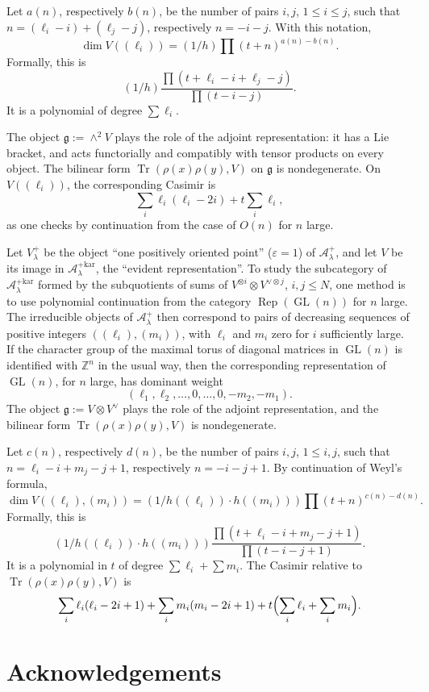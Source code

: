 \documentclass[11pt,a4paper]{article}
\DeclareMathOperator{\Tr}{Tr}
\DeclareMathOperator{\Rep}{Rep}
\DeclareMathOperator{\GL}{GL}
\newcommand{\frg}{\mathfrak{g}}
\newcommand{\Z}{\mathbb{Z}}
\begin{document}
Let $a(n)$, respectively $b(n)$, be the number of pairs $i,j$, $1\leq i\leq j$, such that $n=(\ell_i-i)+(\ell_j-j)$, respectively $n=-i-j$. With this notation,
\[
\dim V((\ell_i))=(1/h)\prod(t+n)^{a(n)-b(n)}.
\]
Formally, this is
\[
(1/h)\frac{\prod(t+\ell_i-i+\ell_j-j)}{\prod(t-i-j)}.
\]
It is a polynomial of degree $\sum\ell_i$.

The object $\frg:=\wedge^2V$ plays the role of the adjoint representation: it has a Lie bracket, and acts functorially and compatibly with tensor products on every object. The bilinear form $\Tr(\rho(x)\rho(y),V)$ on $\frg$ is nondegenerate. On $V((\ell_i))$, the corresponding Casimir is
\[
\sum_i\ell_i(\ell_i-2i)+t\sum_i\ell_i,
\]
as one checks by continuation from the case of $O(n)$ for $n$ large.

Let $V_\lambda^+$ be the object ``one positively oriented point'' ($\varepsilon=1$) of $\mathcal A_\lambda^+$, and let $V$ be its image in $\mathcal A_\lambda^{+\mathrm{kar}}$, the ``evident representation''. To study the subcategory of $\mathcal A_\lambda^{+\mathrm{kar}}$ formed by the subquotients of sums of $V^{\otimes i}\otimes V^{\vee\otimes j}$, $i,j\leq N$, one method is to use polynomial continuation from the category $\Rep(\GL(n))$ for $n$ large. The irreducible objects of $\mathcal A_\lambda^+$ then correspond to pairs of decreasing sequences of positive integers $((\ell_i),(m_i))$, with $\ell_i$ and $m_i$ zero for $i$ sufficiently large. If the character group of the maximal torus of diagonal matrices in $\GL(n)$ is identified with $\Z^n$ in the usual way, then the corresponding representation of $\GL(n)$, for $n$ large, has dominant weight
\[
(\ell_1,\ell_2,\ldots,0,\ldots,0,-m_2,-m_1).
\]
The object $\frg:=V\otimes V^\vee$ plays the role of the adjoint representation, and the bilinear form $\Tr(\rho(x)\rho(y),V)$ is nondegenerate.

Let $c(n)$, respectively $d(n)$, be the number of pairs $i,j$, $1\leq i,j$, such that $n=\ell_i-i+m_j-j+1$, respectively $n=-i-j+1$. By continuation of Weyl's formula,
\[
\dim V((\ell_i),(m_i))=(1/h((\ell_i))\cdot h((m_i)))\prod(t+n)^{c(n)-d(n)}.
\]
Formally, this is
\[
(1/h((\ell_i))\cdot h((m_i)))\frac{\prod(t+\ell_i-i+m_j-j+1)}{\prod(t-i-j+1)}.
\]
It is a polynomial in $t$ of degree $\sum\ell_i+\sum m_i$. The Casimir relative to $\Tr(\rho(x)\rho(y),V)$ is
\[
\sum_i\ell_i(\ell_i-2i+1)+\sum_i m_i(m_i-2i+1)+t\Bigl(\sum_i\ell_i+\sum_i m_i\Bigr).
\]

\section*{Acknowledgements}
\end{document}
